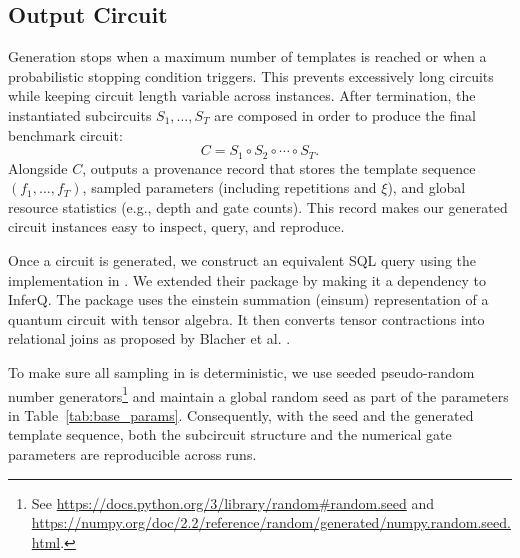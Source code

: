  

\subsection{Output Circuit}
\label{sssec:merge}
Generation stops when a maximum number of templates is reached or when a probabilistic stopping condition triggers.
This prevents excessively long circuits while keeping circuit length variable across instances. 
After termination, the instantiated subcircuits \(S_1,\ldots,S_T\) are composed in order to
produce the final benchmark circuit:
\begin{equation}
C = S_1 \circ S_2 \circ \cdots \circ S_T.
\end{equation}
Alongside \(C\), \sys outputs a provenance record that stores the template sequence
\((f_1,\ldots,f_T)\), sampled parameters (including repetitions and \(\xi\)), and global
resource statistics (e.g., depth and gate counts). This record makes our generated circuit instances
easy to inspect, query, and reproduce. 

\medskip
{} Once a circuit is generated, we construct an equivalent SQL query using the implementation in \cite{hai2025quantum}. We extended their package by making it a dependency to InferQ. The package uses the einstein summation (einsum) representation of a quantum circuit with tensor algebra. It then converts tensor contractions into relational  joins as proposed by Blacher et al. \cite{einsteinSQL2023}. 

\medskip
{} To make sure 
all sampling in \sys is deterministic, we use seeded pseudo-random number generators\footnote{See
\url{https://docs.python.org/3/library/random\#random.seed} and
\url{https://numpy.org/doc/2.2/reference/random/generated/numpy.random.seed.html}.} and maintain a global random seed as part of the parameters in Table~\ref{tab:base_params}. Consequently, with the seed and the generated template
sequence, both the subcircuit structure and the numerical gate parameters are 
reproducible across runs.




